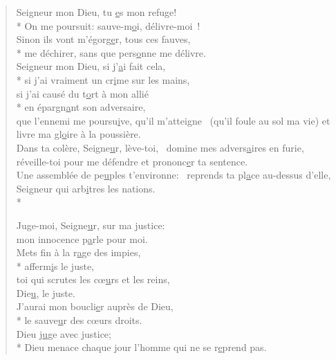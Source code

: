 
\begin{verse}
Seigneur mon Dieu, tu \underline{e}s mon refuge! \\*
On me poursuit: sauve-m\underline{o}i, délivre-moi ! \\
Sinon ils vont m’égorg\underline{e}r, tous ces fauves, \\*
me déchirer, sans que pers\underline{o}nne me délivre. \\

Seigneur mon Dieu, si j’\underline{a}i fait cela, \\*
si j’ai vraiment un cr\underline{i}me sur les mains, \\
si j’ai causé du t\underline{o}rt à mon allié \\*
en épargn\underline{a}nt son adversaire, \\
que l’ennemi me poursu\underline{i}ve, qu’il m’atteigne~\psalmstar
(qu’il foule au sol ma vie)
et livre ma gl\underline{o}ire à la poussière. \\

Dans ta colère, Seigne\underline{u}r, lève-toi,~\psalmdagger
domine mes advers\underline{a}ires en furie, \\
réveille-toi pour me défendre et prononc\underline{e}r ta sentence. \\
Une assemblée de pe\underline{u}ples t’environne:~\psalmdagger
reprends ta pl\underline{a}ce au-dessus d’elle, \\
Seigneur qui arb\underline{i}tres les nations. \\*

Juge-moi, Seigne\underline{u}r, sur ma justice: \\
mon innocence p\underline{a}rle pour moi. \\
Mets fin à la r\underline{a}ge des impies, \\*
afferm\underline{i}s le juste, \\
toi qui scrutes les cœ\underline{u}rs et les reins, \\
Die\underline{u}, le juste. \\

J’aurai mon boucli\underline{e}r auprès de Dieu, \\*
le sauve\underline{u}r des cœurs droits. \\
Dieu j\underline{u}ge avec justice; \\*
Dieu menace chaque jour
l’homme qui ne se r\underline{e}prend pas. \\


\end{verse}
